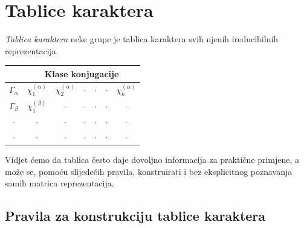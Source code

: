 \section{Tablice karaktera}

\emph{Tablica karaktera} neke grupe je tablica karaktera svih njenih
ireducibilnih reprezentacija.
\begin{center}
    \setlength{\tabcolsep}{12pt}
    \renewcommand{\arraystretch}{2.0}
\begin{tabular}{c|cccccc}
               & \multicolumn{6}{c}{Klase konjugacije} \\ \hline
  $\Gamma_{\alpha}$ & $\chi_{1}^{(\alpha)}$ & $\chi_{2}^{(\alpha)}$ & $\cdot$ &
       $\cdot$ & $\cdot$ & $\chi_{k}^{(\alpha)}$ \\
  $\Gamma_{\beta}$  & $\chi_{1}^{(\beta)}$  & $\cdot$ & $\cdot$ & $\cdot$ & $\cdot$  & $\cdot$ \\
     $\cdot$ &  $\cdot$   & $\cdot$ & $\cdot$ & $\cdot$ & $\cdot$  & $\cdot$ \\
     $\cdot$ &  $\cdot$   & $\cdot$ & $\cdot$ & $\cdot$ & $\cdot$  & $\cdot$ \\
\end{tabular}
    \renewcommand{\arraystretch}{1.0}
\end{center}
Vidjet ćemo da tablica često daje dovoljno informacija za praktične primjene, a može
se, pomoću slijedećih pravila, konstruirati i bez eksplicitnog
poznavanja samih matrica reprezentacija.

\subsection*{Pravila za konstrukciju tablice karaktera}

